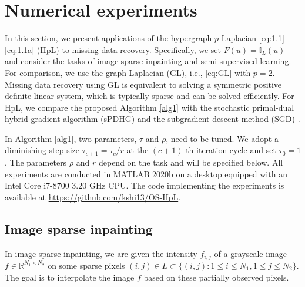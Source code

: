 \documentclass{article}
\theoremstyle{definition}
\begin{document}
\section{Numerical experiments}
In this section, we present applications of the hypergraph $p$-Laplacian \eqref{eq:1.1}--\eqref{eq:1.1a} (HpL) to missing data recovery.
Specifically, we set $F(u) = \mathbb{I}_L(u)$ and consider the tasks of image sparse inpainting and semi-supervised learning.
For comparison, we use the graph Laplacian (GL), i.e., \eqref{eq:GL} with $p = 2$. Missing data recovery using GL is equivalent to solving a symmetric positive definite linear system, which is typically sparse and can be solved efficiently.
For HpL, we compare the proposed Algorithm \ref{alg1} with the stochastic primal-dual hybrid gradient algorithm (sPDHG) \cite{shi2025hypergraph} and the subgradient descent method (SGD) \cite{zhang2017re}.

In Algorithm \ref{alg1}, two parameters, $\tau$ and $\rho$, need to be tuned. We adopt a diminishing step size $\tau_{c+1} = \tau_c / r$ at the $(c+1)$-th iteration cycle and set $\tau_0 = 1$.
The parameters $\rho$ and $r$ depend on the task and will be specified below.
All experiments are conducted in MATLAB 2020b on a desktop equipped with an Intel Core i7-8700 3.20 GHz CPU.
The code implementing the experiments is available at \url{https://github.com/kshi13/OS-HpL}.


\subsection{Image sparse inpainting}\label{section:inpainting}
In image sparse inpainting, we are given the intensity $f_{i,j}$ of a grayscale image $f\in \mathbb{R}^{N_1\times N_2}$ on some sparse pixels $(i,j)\in L\subset \{(i,j): 1\leq i\leq N_1, 1\leq j\leq N_2\}$. The goal is to interpolate the image $f$ based on these partially observed pixels.
\end{document}
